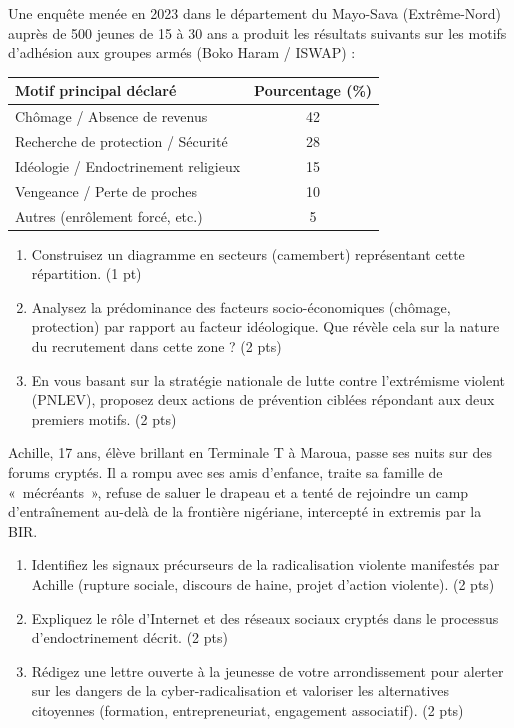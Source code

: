 \documentclass[11pt]{article}
\begin{document}
\begin{exercice}
Une enquête menée en 2023 dans le département du Mayo-Sava (Extrême-Nord) auprès de 500 jeunes de 15 à 30 ans a produit les résultats suivants sur les motifs d'adhésion aux groupes armés (Boko Haram / ISWAP) :

\begin{tabular}{|l|c|}
\hline
\textbf{Motif principal déclaré} & \textbf{Pourcentage (\%)} \\ \hline
Chômage / Absence de revenus & 42 \\ \hline
Recherche de protection / Sécurité & 28 \\ \hline
Idéologie / Endoctrinement religieux & 15 \\ \hline
Vengeance / Perte de proches & 10 \\ \hline
Autres (enrôlement forcé, etc.) & 5 \\ \hline
\end{tabular}

\begin{enumerate}
    \item Construisez un diagramme en secteurs (camembert) représentant cette répartition. (1 pt)
    \item Analysez la prédominance des facteurs socio-économiques (chômage, protection) par rapport au facteur idéologique. Que révèle cela sur la nature du recrutement dans cette zone ? (2 pts)
    \item En vous basant sur la stratégie nationale de lutte contre l'extrémisme violent (PNLEV), proposez deux actions de prévention ciblées répondant aux deux premiers motifs. (2 pts)
\end{enumerate}
\end{exercice}

\begin{exercice}
Achille, 17 ans, élève brillant en Terminale T à Maroua, passe ses nuits sur des forums cryptés. Il a rompu avec ses amis d'enfance, traite sa famille de «~mécréants~», refuse de saluer le drapeau et a tenté de rejoindre un camp d'entraînement au-delà de la frontière nigériane, intercepté in extremis par la BIR.
\begin{enumerate}
    \item Identifiez les signaux précurseurs de la radicalisation violente manifestés par Achille (rupture sociale, discours de haine, projet d'action violente). (2 pts)
    \item Expliquez le rôle d'Internet et des réseaux sociaux cryptés dans le processus d'endoctrinement décrit. (2 pts)
    \item Rédigez une lettre ouverte à la jeunesse de votre arrondissement pour alerter sur les dangers de la cyber-radicalisation et valoriser les alternatives citoyennes (formation, entrepreneuriat, engagement associatif). (2 pts)
\end{enumerate}
\end{exercice}
\end{document}
